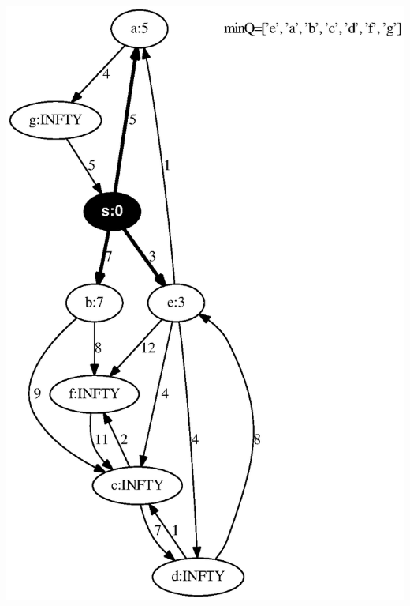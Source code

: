 \documentclass{article}
\begin{document}
\includegraphics[height=.3\textheight]{dijkstra_gross_yellen_01.eps}
\vspace{1em}
\end{document}
